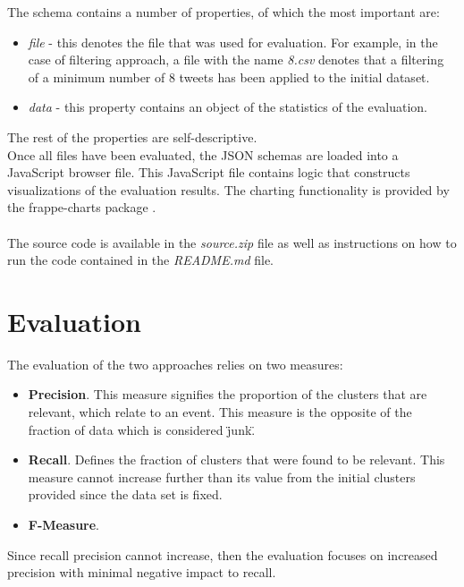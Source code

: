 \documentclass[a4paper,portrait,12pt]{article}
\begin{document}
The schema contains a number of properties, of which the most important are:
\begin{itemize}
	\item \textit{file} - this denotes the file that was used for evaluation.
	      For example, in the case of filtering approach, a file with the name \textit{8.csv} denotes that a filtering of a minimum number of 8 tweets has been applied to the initial dataset.
	\item \textit{data} - this property contains an object of the statistics of the evaluation.
\end{itemize}

The rest of the properties are self-descriptive.\\

Once all files have been evaluated, the JSON schemas are loaded into a JavaScript browser file.
This JavaScript file contains logic that constructs visualizations of the evaluation results.
The charting functionality is provided by the frappe-charts package \cite{frappeCharts}.\\\\

The source code is available in the \textit{source.zip} file as well as instructions on how to run the code contained in the \textit{README.md} file.

\section{Evaluation}
\label{section-eval}

The evaluation of the two approaches relies on two measures:
\begin{itemize}
	\item \textbf{Precision}. This measure signifies the proportion of the clusters that are relevant, which relate to an event.
	      This measure is the opposite of the fraction of data which is considered \"junk\".
	\item \textbf{Recall}. Defines the fraction of clusters that were found to be relevant.
	      This measure cannot increase further than its value from the initial clusters provided since the data set is fixed.
	\item \textbf{F-Measure}.
\end{itemize}

Since recall precision cannot increase, then the evaluation focuses on increased precision with minimal negative impact to recall.
\end{document}
